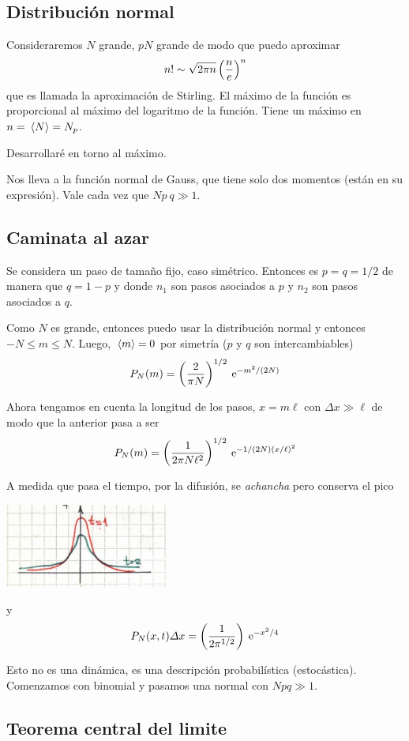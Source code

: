 \documentclass[10pt,oneside]{CBFT_book}
\begin{document}
\subsection{Distribución normal}

Consideraremos $N$ grande, $pN$ grande de modo que puedo aproximar 
\[
	n! \sim \sqrt{2\pi n} \left( \frac{ n }{ e } \right)^n
\]
que es llamada la aproximación de Stirling.
El máximo de la función es proporcional al máximo del logaritmo de la función.
Tiene un máximo en $n = \:\left\langle N \right\rangle = N_p$.

Desarrollaré en torno al máximo.

Nos lleva a la función normal de Gauss, que tiene solo dos momentos (están en su
expresión). Vale cada vez que $N p \: q \gg 1$.

\subsection{Caminata al azar}

Se considera un paso de tamaño fijo, caso simétrico. Entonces es $p=q=1/2$ de manera que $q=1-p$
y donde $n_1$ son pasos asociados a $p$ y $n_2$ son pasos asociados a $q$.

Como $N$ es grande, entonces puedo usar la distribución normal y entonces $-N \leq m \leq N$.
Luego, $ \:\left\langle m \right\rangle = 0 $ por simetría ($p$ y $q$ son intercambiables)
\[
	P_N(m) = \left( \frac{ 2 }{ \pi N } \right)^{1/2} \:\mathrm{e}^{- m^2/(2N)}
\]

Ahora tengamos en cuenta la longitud de los pasos, $x = m \ell$ con $\Delta x \gg \ell$ de modo que
la anterior pasa a ser
\[
	P_N(m) = \left( \frac{ 1 }{ 2 \pi N \ell^2  } \right)^{1/2} \:\mathrm{e}^{- 1/(2N) (x/\ell)^2}
\]

A medida que pasa el tiempo, por la difusión, se {\it achancha} pero conserva el pico

\includegraphics[width=0.40\textwidth]{images/1606329120.jpg}

y
\[
	P_N(x,t) \Delta x = \left( \frac{ 1 }{ 2 \pi^{1/2} } \right) \:\mathrm{e}^{-x^2/4}
\]

Esto no es una dinámica, es una descripción probabilística (estocástica).
Comenzamos con binomial y pasamos una normal con $Npq \gg 1$.

\subsection{Teorema central del limite}
\end{document}
